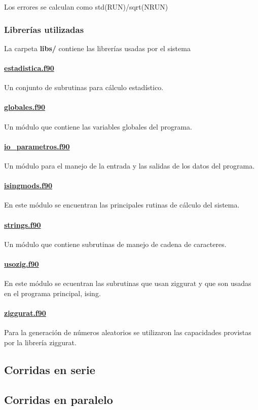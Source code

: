   Los errores se calculan como std(RUN)/sqrt(NRUN)


\subsubsection{Librer\'ias utilizadas}

La carpeta \textbf{libs/} contiene las librer\'ias usadas por el sistema

\paragraph{\underline{estadistica.f90}}

Un conjunto de subrutinas para c\'alculo estad\'istico. 

\paragraph{\underline{globales.f90}}
Un m\'odulo que contiene las variables globales del programa.
	
\paragraph{\underline{io\_parametros.f90}}  
Un m\'odulo para el manejo de la entrada y las salidas de los
datos del programa.


\paragraph{\underline{isingmods.f90}} 
En este m\'odulo  se encuentran las principales rutinas de c\'alculo del
sistema.


\paragraph{\underline{strings.f90}}
Un m\'odulo que contiene subrutinas de manejo de cadena de caracteres.


\paragraph{\underline{usozig.f90}} 
En este m\'odulo se ecuentran las subrutinas que usan ziggurat y que
son usadas en el programa principal, ising.
					
					
\paragraph{\underline{ziggurat.f90}}

Para la generaci\'on de n\'umeros aleatorios se utilizaron
las capacidades provistas por la librer\'ia ziggurat. 



\subsection{Corridas en serie}\label{serie}

\subsection{Corridas en paralelo}\label{paralelo}
